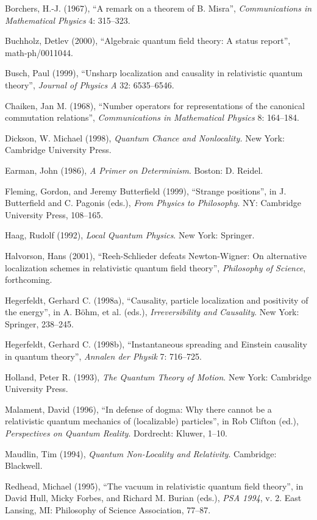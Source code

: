 \documentclass[11pt]{article}
\theoremstyle{remark}
\begin{document}
Borchers, H.-J. (1967), ``A remark on a theorem of B.  Misra'', {\it
  Communications in Mathematical Physics} 4: 315--323.

Buchholz, Detlev (2000), ``Algebraic quantum field theory: A status
report'', math-ph/0011044.
  
Busch, Paul (1999), ``Unsharp localization and causality in
relativistic quantum theory'', {\it Journal of Physics A} 32:
6535--6546.

Chaiken, Jan M. (1968), ``Number operators for representations of the
canonical commutation relations'', {\it Communications in Mathematical
  Physics} 8: 164--184.

Dickson, W. Michael (1998), {\it Quantum Chance and Nonlocality.} New
York: Cambridge University Press.

Earman, John (1986), {\it A Primer on Determinism}. Boston: D.
Reidel.

Fleming, Gordon, and Jeremy Butterfield (1999), ``Strange positions'',
in J. Butterfield and C. Pagonis (eds.), {\it From Physics to
  Philosophy}. NY: Cambridge University Press, 108--165.

Haag, Rudolf (1992), {\it Local Quantum Physics}. New York: Springer.

Halvorson, Hans (2001), ``Reeh-Schlieder defeats Newton-Wigner: On
alternative localization schemes in relativistic quantum field
theory'', {\it Philosophy of Science}, forthcoming.

Hegerfeldt, Gerhard C. (1998a), ``Causality, particle localization and
positivity of the energy'', in A.  B{\"o}hm, et al. (eds.), {\it
  Irreversibility and Causality}. New York: Springer, 238--245.

Hegerfeldt, Gerhard C. (1998b), ``Instantaneous spreading and Einstein
causality in quantum theory'', {\it Annalen der Physik} 7: 716--725.

Holland, Peter R. (1993), {\it The Quantum Theory of Motion}. New
York: Cambridge University Press.

Malament, David (1996), ``In defense of dogma: Why there cannot be a
relativistic quantum mechanics of (localizable) particles'', in Rob
Clifton (ed.), {\it Perspectives on Quantum Reality}. Dordrecht:
Kluwer, 1--10.

Maudlin, Tim (1994), {\it Quantum Non-Locality and Relativity}.
Cambridge: Blackwell.

Redhead, Michael (1995), ``The vacuum in relativistic quantum field
theory'', in David Hull, Micky Forbes, and Richard M. Burian (eds.),
{\it PSA 1994}, v. 2. East Lansing, MI: Philosophy of Science
Association, 77--87.
\end{document}
